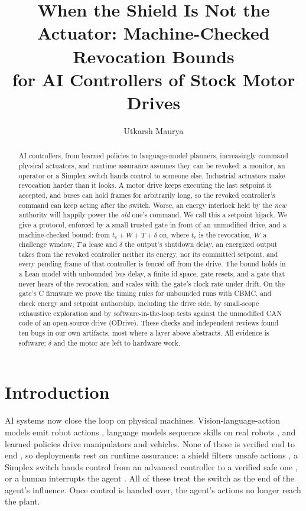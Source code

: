 \documentclass[letterpaper]{article} %
\title{When the Shield Is Not the Actuator: Machine-Checked Revocation Bounds\\for AI Controllers of Stock Motor Drives}
\author{
    Utkarsh Maurya
}
\begin{document}
\maketitle

\begin{abstract}
AI controllers, from learned policies to language-model planners, increasingly command physical
actuators, and runtime assurance assumes they can be revoked: a monitor, an operator or a
Simplex switch hands control to someone else. Industrial actuators make revocation harder than
it looks. A motor drive keeps executing the last setpoint it accepted, and buses can hold frames
for arbitrarily long, so the revoked controller's command can keep acting after the switch. Worse,
an energy interlock held by the \emph{new} authority will happily power the \emph{old} one's
command. We call this a setpoint hijack. We give a protocol, enforced by a small trusted gate in
front of an unmodified drive, and a machine-checked bound: from $t_c + W + T + \delta$ on, where
$t_c$ is the revocation, $W$ a challenge window, $T$ a lease and $\delta$ the output's shutdown
delay, an energized output takes from the revoked controller neither its energy, nor its
committed setpoint, and every pending frame of that controller is fenced off from the drive. The
bound holds in a Lean model with unbounded bus delay, a finite id space, gate resets, and a gate
that never hears of the revocation, and scales with the gate's clock rate under drift. On the
gate's C firmware we prove the timing rules for unbounded runs with CBMC, and check energy and
setpoint authorship, including the drive side, by small-scope exhaustive exploration and by
software-in-the-loop tests against the unmodified CAN code of an open-source drive (ODrive).
These checks and independent reviews found ten bugs in our own artifacts, most where a layer
above abstracts. All evidence is software; $\delta$ and the motor are left to hardware work.
\end{abstract}

\section{Introduction}

AI systems now close the loop on physical machines. Vision-language-action models emit robot
actions \citep{brohan2023rt2}, language models sequence skills on real
robots \citep{ahn2022saycan}, and learned policies drive manipulators and vehicles. None of these
is verified end to end \citep{seshia2022verifiedai}, so deployments rest on runtime assurance: a
shield filters unsafe actions \citep{alshiekh2018shield}, a Simplex switch hands control from an
advanced controller to a verified safe one \citep{sha2001simplex,phan2020nsa}, or a human
interrupts the agent \citep{orseau2016interruptible,hadfield2017offswitch}. All of these treat the
switch as the end of the agent's influence. Once control is handed over, the agent's actions no
longer reach the plant.
\end{document}
